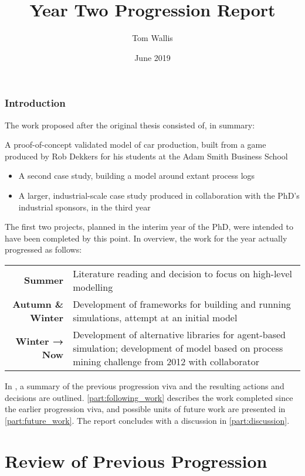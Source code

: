 \documentclass[11pt]{article}
\author{Tom Wallis}
\date{June 2019}
\title{Year Two Progression Report}
\newcommand{\ampersand}{\&}
\begin{document}
\maketitle

\section{Introduction}
\label{sec:orgf4051b4}

The work proposed after the original thesis consisted of, in summary:

A proof-of-concept validated model of car production, built from a game
 produced by Rob Dekkers for his students at the Adam Smith Business School
\begin{itemize}
\item A second case study, building a model around extant process logs
\item A larger, industrial-scale case study produced in collaboration with the
PhD's industrial sponsors, in the third year
\end{itemize}

The first two projects, planned in the interim year of the PhD, were intended to
have been completed by this point. In overview, the work for the year actually
progressed as follows: \par

\begin{center}
\begin{tabular}{r p{8.5cm}}
\bf{Summer} & Literature reading and decision to focus on high-level modelling \\
\bf{Autumn \ampersand{} Winter} & Development of frameworks for building and running simulations, attempt at an initial model \\
\bf{Winter → Now} & Development of alternative libraries for agent-based simulation;
development of model based on process mining challenge from 2012 with collaborator \\
\end{tabular}
\end{center}

In \cref{part:previous_viva_summary}, a summary of the previous progression viva
and the resulting actions and decisions are outlined. \cref{part:following_work}
describes the work completed since the earlier progression viva, and possible
units of future work are presented in \cref{part:future_work}. The report
concludes with a discussion in \cref{part:discussion}.

\part{Review of Previous Progression}
\label{part:previous_viva_summary}
\end{document}
